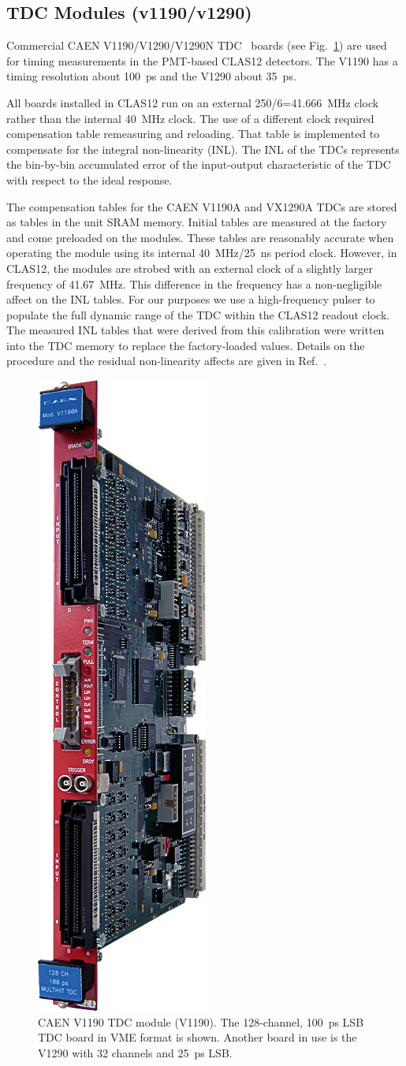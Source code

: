 \subsection{TDC Modules (v1190/v1290)}

Commercial CAEN V1190/V1290/V1290N TDC~\cite{tdc-ref} boards (see Fig.~\ref{fig:v1190_board}) are used for
timing measurements in the PMT-based CLAS12 detectors. The V1190 has a timing resolution about 100~ps and the
V1290 about 35~ps.

All boards installed in CLAS12 run on an external 250/6=41.666~MHz clock rather than the internal 40~MHz clock.
The use of a different clock required compensation table remeasuring and reloading. That table is implemented to
compensate for the  integral non-linearity (INL). The INL of the TDCs represents the bin-by-bin accumulated error
of the input-output characteristic of the TDC with respect to the ideal response.

The compensation tables for the CAEN V1190A and VX1290A TDCs are stored as tables in the unit SRAM memory. Initial
tables are measured at the factory and come preloaded on the modules. These tables are reasonably accurate when
operating the module using its internal 40~MHz/25~ns period clock. However, in CLAS12, the modules are strobed with
an external clock of a slightly larger frequency of 41.67~MHz. This difference in the frequency has a non-negligible affect
on the INL tables. For our purposes we use a high-frequency pulser to populate the full dynamic range of the TDC within
the CLAS12 readout clock. The measured INL tables that were derived from this calibration were written into the
TDC memory to replace the factory-loaded values. Details on the procedure and the residual non-linearity affects are
given in Ref.~\cite{inl-tables}.

\begin{figure}[hbt]
	\centering
	\includegraphics[width=0.2\columnwidth,keepaspectratio]{img/v1190_board.jpg}
	\caption{CAEN V1190 TDC module (V1190). The 128-channel, 100~ps LSB TDC board in VME format is shown.
          Another board in use is the V1290 with 32 channels and 25~ps LSB.}
	\label{fig:v1190_board}
\end{figure}


